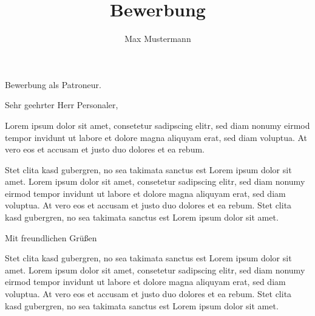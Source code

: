 \documentclass[german]{alpication}
\author{Max Mustermann}
\title{Bewerbung}
\begin{document}
% 
% 
\begin{correspondence}{Bewerbung als Patroneur.}		%
	\opening{Sehr geehrter Herr Personaler,}	%

	Lorem ipsum dolor sit amet, consetetur sadipscing elitr, sed diam nonumy eirmod tempor invidunt ut labore
	et dolore magna aliquyam erat, sed diam voluptua. At vero eos et accusam et justo duo dolores et ea rebum.
	
	Stet clita kasd gubergren, no sea takimata sanctus est Lorem ipsum dolor sit amet. Lorem ipsum dolor sit amet,
	consetetur sadipscing elitr, sed diam nonumy eirmod tempor invidunt ut labore et dolore magna aliquyam erat,
	sed diam voluptua. At vero eos et accusam et justo duo dolores et ea rebum. Stet clita kasd gubergren, no sea
	takimata sanctus est Lorem ipsum dolor sit amet.

	\closing{Mit freundlichen Grüßen}
	
	\appendixList	%
	
\end{correspondence}

% 
%
\begin{motivation}
	Stet clita kasd gubergren, no sea takimata sanctus est Lorem ipsum dolor sit amet. Lorem ipsum dolor sit amet,
	consetetur sadipscing elitr, sed diam nonumy eirmod tempor invidunt ut labore et dolore magna aliquyam erat,
	sed diam voluptua. At vero eos et accusam et justo duo dolores et ea rebum. Stet clita kasd gubergren, no sea
	takimata sanctus est Lorem ipsum dolor sit amet.
\end{motivation}
\end{document}
